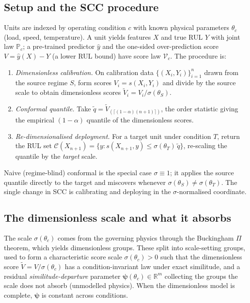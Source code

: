 \documentclass[review,times]{elsarticle}
\theoremstyle{definition}
\theoremstyle{remark}
\newcommand{\law}[1]{\mathcal{V}_{#1}}
\begin{document}
\subsection{Setup and the SCC procedure}\label{sec:procedure}
Units are indexed by operating condition $c$ with known physical parameters $\theta_c$ (load, speed,
temperature). A unit yields features $X$ and true RUL $Y$ with joint law $\mathbb P_c$; a pre-trained
predictor $\hat y$ and the one-sided over-prediction score $V=\hat y(X)-Y$ (a lower RUL bound) have
score law $\law c$. The procedure is:
\begin{enumerate}
\item \emph{Dimensionless calibration.} On calibration data $\{(X_i,Y_i)\}_{i=1}^n$ drawn from the
source regime $S$, form scores $V_i=s(X_i,Y_i)$ and divide by the source scale to obtain dimensionless
scores $\tilde V_i=V_i/\sigma(\theta_S)$.
\item \emph{Conformal quantile.} Take $\tilde q=\tilde V_{(\lceil(1-\alpha)(n+1)\rceil)}$, the order
statistic giving the empirical $(1-\alpha)$ quantile of the dimensionless scores.
\item \emph{Re-dimensionalised deployment.} For a target unit under condition $T$, return the RUL set
$\mathcal C(X_{n+1})=\{y:s(X_{n+1},y)\le\sigma(\theta_T)\,\tilde q\}$, re-scaling the quantile by the
\emph{target} scale.
\end{enumerate}
Naive (regime-blind) conformal is the special case $\sigma\equiv1$; it applies the source quantile
directly to the target and miscovers whenever $\sigma(\theta_S)\neq\sigma(\theta_T)$. The single
change in SCC is calibrating and deploying in the $\sigma$-normalised coordinate.

\subsection{The dimensionless scale and what it absorbs}\label{sec:scale}
The scale $\sigma(\theta_c)$ comes from the governing physics through the Buckingham $\Pi$ theorem,
which yields dimensionless groups. These split into scale-setting groups, used to form a
characteristic score scale $\sigma(\theta_c)>0$ such that the dimensionless score
$\tilde V=V/\sigma(\theta_c)$ has a condition-invariant law under exact similitude, and a residual
\emph{similitude-departure} parameter $\boldsymbol\psi(\theta_c)\in\mathbb R^m$ collecting the groups
the scale does not absorb (unmodelled physics). When the dimensionless model is complete,
$\boldsymbol\psi$ is constant across conditions.
\end{document}
